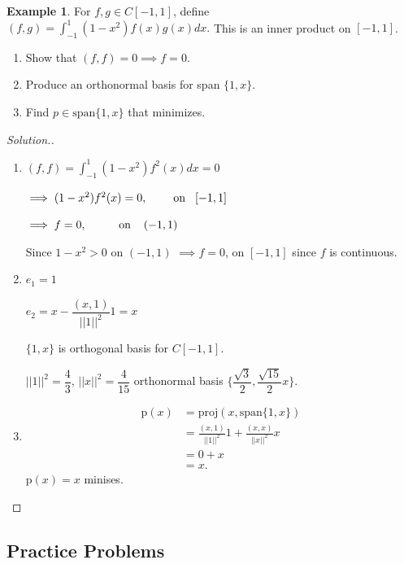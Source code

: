 \documentclass[11pt,a4paper]{article}
\theoremstyle{definition}
\newtheorem{exa}[thm]{Example}
\newenvironment{solution}
  {\renewcommand{\qedsymbol}{}\begin{proof}[\textit{Solution}.]}
  {\end{proof}}
\begin{document}
\begin{exa}
For $f,g\in C[-1,1]$, define \hspace{0.2cm}$\displaystyle{(f,g)=\int^1_{-1}(1-x^2)f(x)g(x)dx}.$
This is an inner product on $[-1,1]$.
\begin{enumerate}
\item Show that $(f,f)=0\implies f=0$.
\item Produce an orthonormal basis for span $\{1,x\}$.
\item Find $p\in \text{span}\{1,x\}$ that minimizes.
\end{enumerate}
\end{exa}

\begin{solution}
\begin{enumerate}
\item \hspace{0.2cm}$\displaystyle{(f,f)=\int^1_{-1}(1-x^2)f^2(x)dx=0}$
 
$\implies (1-x^2)f^2(x)=0,\hspace{0.8cm} \text{on}\hspace{0.3cm} [-1,1]$

$\implies f=0,\hspace{1cm} \text{on}\hspace{0.4cm} (-1,1)$

Since $1-x^2>0$ on $(-1,1)$ $\implies f=0$, on $[-1,1]$ since $f$ is continuous.
\item  \hspace{0.2cm} $e_1 =1$

$e_2 =x-\dfrac{(x,1)}{||1||^2}1=x$

$\{1,x\}$ is orthogonal basis for $C[-1,1]$.

$||1||^2=\dfrac{4}{3}$, $||x||^2=\dfrac{4}{15}$ orthonormal basis $\Big\{\dfrac{\sqrt{3}}{2},\dfrac{\sqrt{15}}{2}x\Big\}$.
\item
\begin{align*}
\text{p}(x) &=\text{proj}(x,\text{span}\{1,x\})\\
              &=\frac{(x,1)}{||1||^2}1+\frac{(x,x)}{||x||^2}x\\
              &=0+x\\
              &=x.
\end{align*}
$\text{p}(x)=x$ minises.
\end{enumerate}


\pagebreak
\end{solution}
\subsection{Practice Problems}
\end{document}
